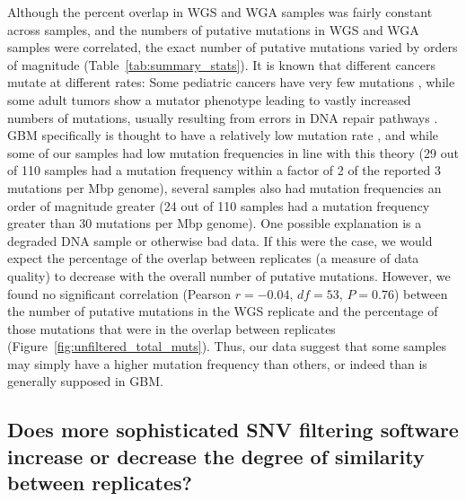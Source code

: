 \documentclass[11pt]{article} %
\begin{document}
Although the percent overlap in WGS and WGA samples was fairly constant across samples, and the numbers of putative mutations in WGS and WGA samples were correlated, the exact number of putative mutations varied by orders of magnitude (Table~\ref{tab:summary_stats}). It is known that different cancers mutate at different rates: Some pediatric cancers have very few mutations \citep{RB2hit, pediatric}, while some adult tumors show a mutator phenotype leading to vastly increased numbers of mutations, usually resulting from errors in DNA repair pathways \citep{mutator}. GBM specifically is thought to have a relatively low mutation rate \citep{Parsons, TCGA-GBM-13}, and while some of our samples had low mutation frequencies in line with this theory (29 out of 110 samples had a mutation frequency within a factor of 2 of the reported 3 mutations per Mbp genome), several samples also had mutation frequencies an order of magnitude greater (24 out of 110 samples had a mutation frequency greater than 30 mutations per Mbp genome). One possible explanation is a degraded DNA sample or otherwise bad data. If this were the case, we would expect the percentage of the overlap between replicates (a measure of data quality) to decrease with the overall number of putative mutations. However, we found no significant correlation (Pearson $r=-0.04$, $df=53$, $P=0.76$) between the number of putative mutations in the WGS replicate and the percentage of those mutations that were in the overlap between replicates (Figure~\ref{fig:unfiltered_total_muts}). Thus, our data suggest that some samples may simply have a higher mutation frequency than others, or indeed than is generally supposed in GBM.

\subsection*{Does more sophisticated SNV filtering software increase or decrease the degree of similarity between replicates?}
\end{document}
